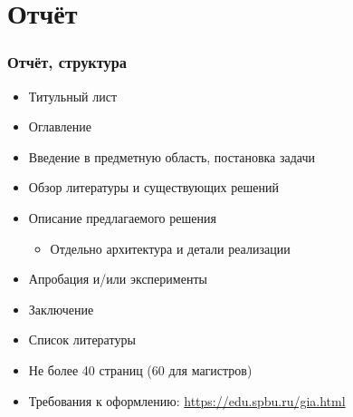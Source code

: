 \documentclass[xetex,mathserif,serif]{beamer}
\begin{document}
    \section{Отчёт}

    \begin{frame}
        \frametitle{Отчёт, структура}
        \begin{itemize}
            \item Титульный лист
            \item Оглавление
            \item Введение в предметную область, постановка задачи
            \item Обзор литературы и существующих решений
            \item Описание предлагаемого решения
            \begin{itemize}
                \item Отдельно архитектура и детали реализации
            \end{itemize}
            \item Апробация и/или эксперименты
            \item Заключение
            \item Список литературы
            \item Не более 40 страниц (60 для магистров)
            \item Требования к оформлению: \url{https://edu.spbu.ru/gia.html}
        \end{itemize}
    \end{frame}
\end{document}
